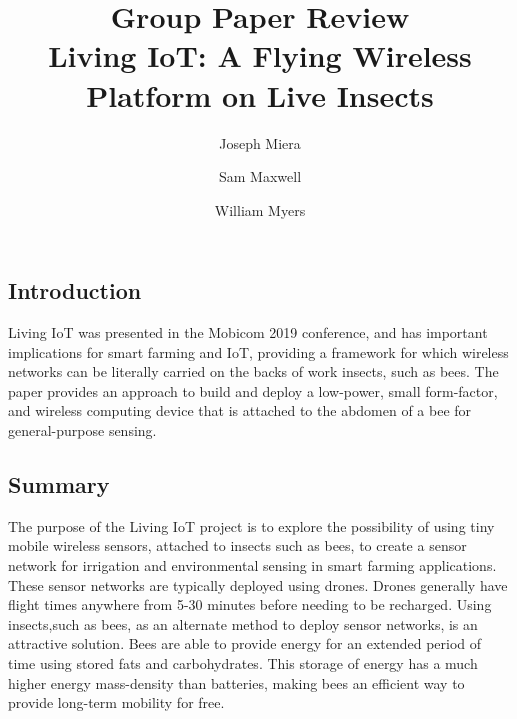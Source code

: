 \documentclass[letterpaper,twocolumn,10pt]{article}
\title{Group Paper Review\\
Living IoT: A Flying Wireless Platform on Live Insects}
\author{Joseph Miera}
\author{Sam Maxwell}
\author{William Myers}
\affil{Brigham Young University}
\begin{document}
\maketitle

\subsection*{Introduction}

Living IoT was presented in the Mobicom 2019 conference, and has important implications for smart farming and IoT, providing a framework for which wireless networks can be literally carried on the backs of work insects, such as bees. The paper provides an approach to build and deploy a low-power, small form-factor, and wireless computing device that is attached to the abdomen of a bee for general-purpose sensing.

\subsection*{Summary}
 
The purpose of the Living IoT project is to explore the possibility of using tiny mobile wireless sensors, attached to insects such as bees, to create a sensor network for irrigation and environmental sensing in smart farming applications. These sensor networks are typically deployed using drones. Drones generally have flight times anywhere from 5-30 minutes before needing to be recharged. Using insects,such as bees, as an alternate method to deploy sensor networks, is an attractive solution. Bees are able to provide energy for an extended period of time using stored fats and carbohydrates. This storage of energy has a much higher energy mass-density than batteries, making bees an efficient way to provide long-term mobility for free. 
 
\end{document}
